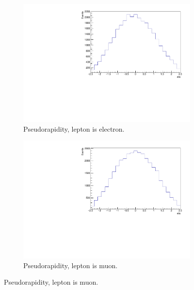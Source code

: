 \begin{figure}[H]
  \begin{subfigure}{0.45\textwidth}%
    \centering%
    \includegraphics[width=\textwidth]{plots/ttbar_distributions/ttbar.el_jet_eta_max.pdf}%
    \caption{Pseudorapidity, lepton is electron.}%
    \label{fig:4c}%
  \end{subfigure}%
  \hfill
  \begin{subfigure}{0.45\textwidth}%
    \centering%
    \includegraphics[width=\textwidth]{plots/ttbar_distributions/ttbar.mu_jet_eta_max.pdf}%
    \caption{Pseudorapidity, lepton is muon.}%
    \label{fig:4d}%
  \end{subfigure}%


\end{figure}
